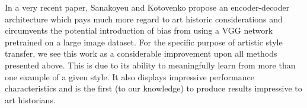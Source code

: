 In a very recent paper, Sanakoyeu and Kotovenko \cite{sanakoyeu2018style} propose an encoder-decoder architecture which pays much more regard to art historic considerations and circumvents the potential introduction of bias from using a VGG network pretrained on a large image dataset. For the specific purpose of artistic style transfer, we see this work as a considerable improvement upon all methods presented above. This is due to its ability to meaningfully learn from more than one example of a given style. It also displays impressive performance characteristics and is the first (to our knowledge) to produce results impressive to art historians.

